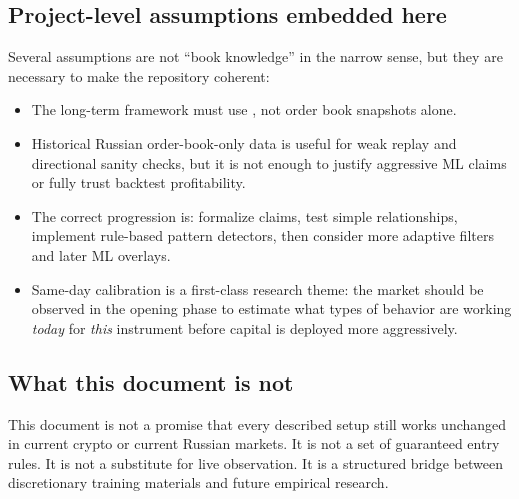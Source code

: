 \subsection{Project-level assumptions embedded here}

Several assumptions are not ``book knowledge'' in the narrow sense, but they are necessary to
make the repository coherent:

\begin{itemize}[leftmargin=1.4em]
  \item The long-term framework must use , not
        order book snapshots alone.
  \item Historical Russian order-book-only data is useful for weak replay and directional sanity
        checks, but it is not enough to justify aggressive ML claims or fully trust backtest
        profitability.
  \item The correct progression is: formalize claims, test simple relationships, implement rule-based
        pattern detectors, then consider more adaptive filters and later ML overlays.
  \item Same-day calibration is a first-class research theme: the market should be observed in the
        opening phase to estimate what types of behavior are working \emph{today} for \emph{this}
        instrument before capital is deployed more aggressively.
\end{itemize}

\subsection{What this document is not}

This document is not a promise that every described setup still works unchanged in current
crypto or current Russian markets. It is not a set of guaranteed entry rules. It is not a
substitute for live observation. It is a structured bridge between discretionary training
materials and future empirical research.
